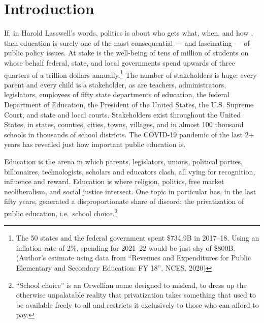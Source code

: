 
\begin{comment}
This section provides a general introduction to the area of study and presents the problem to be
investigated in the study. The purpose of the study needs to be clearly stated and describe the
following:
 a. The unresolved issue in education
 b. The significance of the problem
 c. The justification for investigating the problem
 d. An explanation of the importance of conducting a study to help resolve that issue
 e. Initial definitions for important terms and concepts likely to be used throughout the proposal
\end{comment}

\chapter{Introduction}\label{ch:Introduction}
\bigskip%
If, in Harold Lasswell's words, politics is about who gets what, when, and how \parencite{Lasswell1936}, then education is surely one of the most consequential — and fascinating — of public policy issues. At stake is the well-being of tens of million of students on whose behalf federal, state, and local governments spend upwards of three quarters of a trillion dollars annually.\footnote{The 50 states and the federal government spent \$734.9B in 2017–18. Using an inflation rate of 2\%, spending for 2021–22 would be just shy of \$800B. (Author's estimate using data from ``Revenues and Expenditures for Public Elementary and Secondary Education: FY 18'', NCES, 2020)} The number of stakeholders is huge: every parent and every child is a stakeholder, as are teachers, administrators, legislators, employees of fifty state departments of education, the federal Department of Education, the President of the United States, the U.S. Supreme Court, and state and local courts. Stakeholders exist throughout the United States, in states, counties, cities, towns, villages, and in almost 100 thousand schools in thousands of school districts. The COVID-19 pandemic of the last 2+ years has revealed just how important public education is.

Education is the arena in which parents, legislators, unions, political parties, billionaires, technologists, scholars and educators clash, all vying for recognition, influence and reward. Education is where religion, politics, free market neoliberalism, and social justice intersect. One topic in particular has, in the last fifty years, generated a disproportionate share of discord: the privatization of public education, i.e.~school choice.\footnote{``School choice'' is an Orwellian name designed to mislead, to dress up the otherwise unpalatable reality that privatization takes something that used to be available freely to all and restricts it exclusively to those who can afford to pay.}

